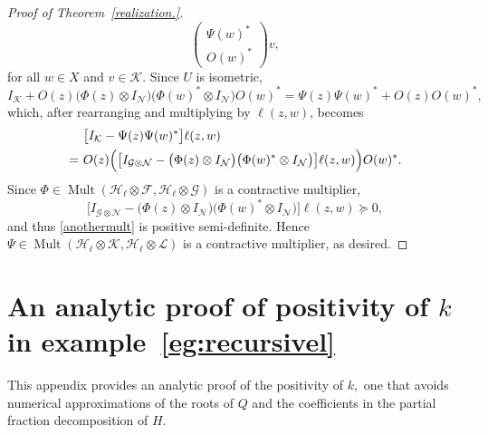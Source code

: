 \documentclass[a4paper,reqno,index]{amsart}
\numberwithin{equation}{section}
\newcommand{\Mult}{\operatorname{Mult}}
\newcommand{\opphi}[4]{{#1}\in \Mult({#3},{#4})}
\theoremstyle{definition}
\begin{document}
\begin{proof}[Proof of Theorem~\ref{realization.}]
\[\begin{pmatrix}
\Psi(w)^* \\
O(w)^*
\end{pmatrix}v,
\]
for all $w\in X$ and $v\in\mathcal{K}$.
 Since $U$ is isometric,
\[ I_{\mathcal{K}}+O(z)\big(\Phi(z)\otimes I_{\mathcal{N}}\big)\big(\Phi(w)^*\otimes I_{\mathcal{N}}\big)O(w)^*=\Psi(z)\Psi(w)^*+O(z)O(w)^*, \]
which, after rearranging and multiplying by $\ell(z, w)$, becomes
\begin{align}
& \ \big[I_{\mathcal{K}}-\Psi(z)\Psi(w)^*\big]\ell(z, w) \notag \\ 
=&\ O(z)\Big(\big[I_{\mathcal{G}\otimes\mathcal{N}}- \big(\Phi(z)\otimes I_{\mathcal{N}}\big) \big(\Phi(w)^*\otimes I_{\mathcal{N}}\big)     \big]\ell(z, w)\Big)O(w)^*. \label{anothermult}  
\end{align}
 Since $\opphi{\Phi}{X}{\mathcal{H}_{\ell}\otimes\mathcal{F}}{ \mathcal{H}_{\ell}\otimes\mathcal{G}}$ is a contractive multiplier,
 \[\big[I_{\mathcal{G}\otimes\mathcal{N}}- \big(\Phi(z)\otimes I_{\mathcal{N}}\big) \big(\Phi(w)^*\otimes I_{\mathcal{N}}\big)     \big]\ell(z, w)\succeq 0,\]
 and thus \eqref{anothermult} is positive semi-definite.  Hence $\opphi{\Psi}{X}{\mathcal{H}_{\ell}\otimes\mathcal{K}}{\mathcal{H}_{\ell}\otimes\mathcal{L}}$ is a contractive multiplier, as desired. 
\end{proof}


\section{An analytic proof of positivity of \texorpdfstring{$k$}{1/k}
in example~\ref{eg:recursivel}} \label{append-more-example}
This appendix provides an analytic proof of the positivity of
$k,$ one that avoids numerical approximations of the roots
of $Q$ and the coefficients in the partial fraction decomposition
of $H.$
\end{document}
